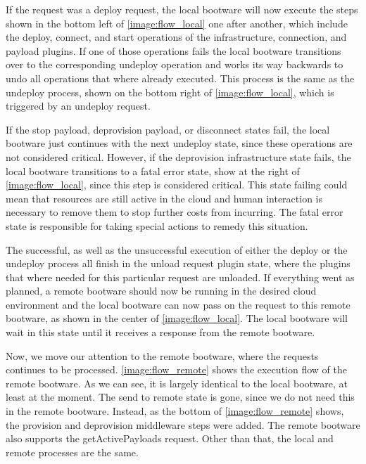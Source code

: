 If the request was a deploy request, the local bootware will now execute the steps shown in the bottom left of \autoref{image:flow_local} one after another, which include the deploy, connect, and start operations of the infrastructure, connection, and payload plugins.
If one of those operations fails the local bootware transitions over to the corresponding undeploy operation and works its way backwards to undo all operations that where already executed.
This process is the same as the undeploy process, shown on the bottom right of \autoref{image:flow_local}, which is triggered by an undeploy request.

If the stop payload, deprovision payload, or disconnect states fail, the local bootware just continues with the next undeploy state, since these operations are not considered critical.
However, if the deprovision infrastructure state fails, the local bootware transitions to a fatal error state, show at the right of \autoref{image:flow_local}, since this step is considered critical.
This state failing could mean that resources are still active in the cloud and human interaction is necessary to remove them to stop further costs from incurring.
The fatal error state is responsible for taking special actions to remedy this situation.

The successful, as well as the unsuccessful execution of either the deploy or the undeploy process all finish in the unload request plugin state, where the plugins that where needed for this particular request are unloaded.
If everything went as planned, a remote bootware should now be running in the desired cloud environment and the local bootware can now pass on the request to this remote bootware, as shown in the center of \autoref{image:flow_local}.
The local bootware will wait in this state until it receives a response from the remote bootware.

Now, we move our attention to the remote bootware, where the requests continues to be processed.
\autoref{image:flow_remote} shows the execution flow of the remote bootware.
As we can see, it is largely identical to the local bootware, at least at the moment.
The send to remote state is gone, since we do not need this in the remote bootware.
Instead, as the bottom of \autoref{image:flow_remote} shows, the provision and deprovision middleware steps were added.
The remote bootware also supports the getActivePayloads request.
Other than that, the local and remote processes are the same.


